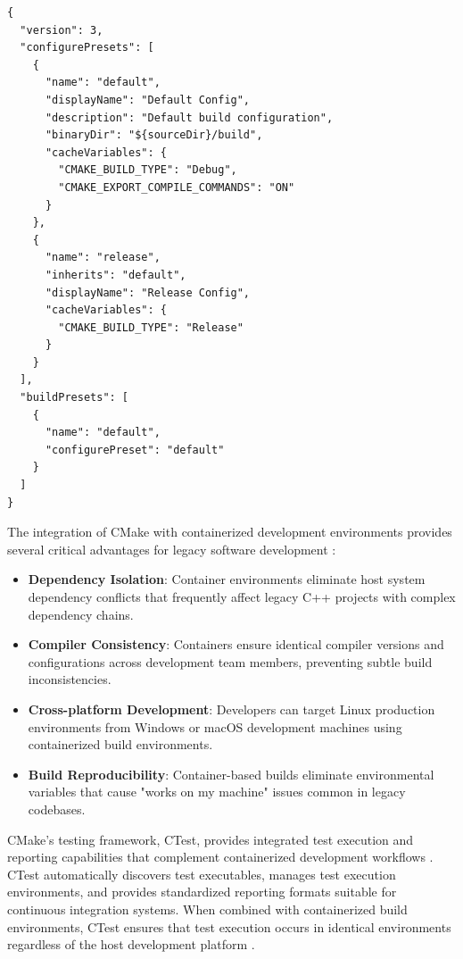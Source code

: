 \newpage
\begin{lstlisting}[caption={Example CMake Preset Configuration}, label={lst:cmake_preset}]
{
  "version": 3,
  "configurePresets": [
    {
      "name": "default",
      "displayName": "Default Config",
      "description": "Default build configuration",
      "binaryDir": "${sourceDir}/build",
      "cacheVariables": {
        "CMAKE_BUILD_TYPE": "Debug",
        "CMAKE_EXPORT_COMPILE_COMMANDS": "ON"
      }
    },
    {
      "name": "release",
      "inherits": "default",
      "displayName": "Release Config",
      "cacheVariables": {
        "CMAKE_BUILD_TYPE": "Release"
      }
    }
  ],
  "buildPresets": [
    {
      "name": "default",
      "configurePreset": "default"
    }
  ]
}
\end{lstlisting}

The integration of CMake with containerized development environments provides several critical advantages for legacy software development \citep{danilovDockerizedBuildEnvironments2021}:
\begin{itemize}
    \item \textbf{Dependency Isolation}: Container environments eliminate host system dependency conflicts that frequently affect legacy C++ projects with complex dependency chains.
    \item \textbf{Compiler Consistency}: Containers ensure identical compiler versions and configurations across development team members, preventing subtle build inconsistencies.
    \item \textbf{Cross-platform Development}: Developers can target Linux production environments from Windows or macOS development machines using containerized build environments.
    \item \textbf{Build Reproducibility}: Container-based builds eliminate environmental variables that cause "works on my machine" issues common in legacy codebases.
\end{itemize}

CMake's testing framework, CTest, provides integrated test execution and reporting capabilities that complement containerized development workflows \citep{swidzinskiModernCMakeEffortlessly2024}.
CTest automatically discovers test executables, manages test execution environments, and provides standardized reporting formats suitable for continuous integration systems.
When combined with containerized build environments, CTest ensures that test execution occurs in identical environments regardless of the host development platform \citep{swidzinskiModernCMakeEffortlessly2024}.

